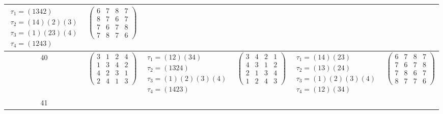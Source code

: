 \begin{longtable}{|c|p{2.7cm}|p{2.7cm}|p{2.7cm}|p{2.7cm}|p{2.7cm}|}
    $\begin{array}{l}\tau_{1}=(1342)\\ \tau_{2}=(14)(2)(3)\\ \tau_{3}=(1)(23)(4)\\ \tau_{4}=(1243)\end{array}$     &
    $\begin{pmatrix} 6 & 7 & 8 & 7 \\ 8 & 7 & 6 & 7 \\ 7 & 6 & 7 & 8 \\ 7 & 8 & 7 & 6 \end{pmatrix}$                                                                                           \\
    \hline
    40                                                                                                             &
    $\begin{pmatrix} 3 & 1 & 2 & 4 \\ 1 & 3 & 4 & 2 \\ 4 & 2 & 3 & 1 \\ 2 & 4 & 1 & 3 \end{pmatrix}$               &
    $\begin{array}{l}\tau_{1}=(12)(34)\\ \tau_{2}=(1324)\\ \tau_{3}=(1)(2)(3)(4)\\ \tau_{4}=(1423)\end{array}$     &
    $\begin{pmatrix} 3 & 4 & 2 & 1 \\ 4 & 3 & 1 & 2 \\ 2 & 1 & 3 & 4 \\ 1 & 2 & 4 & 3 \end{pmatrix}$               &
    $\begin{array}{l}\tau_{1}=(14)(23)\\ \tau_{2}=(13)(24)\\ \tau_{3}=(1)(2)(3)(4)\\ \tau_{4}=(12)(34)\end{array}$ &
    $\begin{pmatrix} 6 & 7 & 8 & 7 \\ 7 & 6 & 7 & 8 \\ 7 & 8 & 6 & 7 \\ 8 & 7 & 7 & 6 \end{pmatrix}$                                                                                           \\
    \hline
    41                                                                                                             &

\end{longtable}
